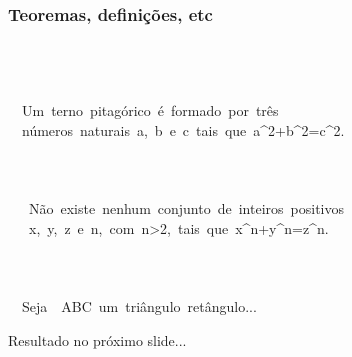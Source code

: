 \begin{frame}
  \frametitle{Teoremas, definições, etc}

  \begin{exemplo}
    \begin{ttfamily}\footnotesize
      \purple{\string\chapter}\\
      \ \\
      \\
        \ \ Um\ \string\emph\ac{}terno\ pitagórico\fc{}\ é\ formado\ por\ três\\
        \ \ números\ naturais\ \dolar{}a\dolar{},\ \dolar{}b\dolar{}\ e\ \dolar{}c\dolar{}\ tais\ que\ \dolar{}a\textasciicircum{}2+b\textasciicircum{}2=c\textasciicircum{}2\dolar{}.\\
        \\
      \ \\
      \ \purple{\string\label}\\
        \ \ \ Não\ existe\ nenhum\ conjunto\ de\ inteiros\ positivos\\
        \ \ \ \dolar{}x\dolar{},\ \dolar{}y\dolar{},\ \dolar{}z\dolar{}\ e\ \dolar{}n\dolar{},\ com\ \dolar{}n>2\dolar{},\ tais\ que\ \dolar{}x\textasciicircum{}n+y\textasciicircum{}n=z\textasciicircum{}n\dolar{}.\\
        \\
      \ \\
      \\
        \ \ Seja\ \dolar{}\string\Delta\ ABC\dolar{}\ um\ triângulo\ retângulo...\\
    \end{ttfamily}

  \end{exemplo}

  {\small Resultado no próximo slide...}
  
\end{frame}

